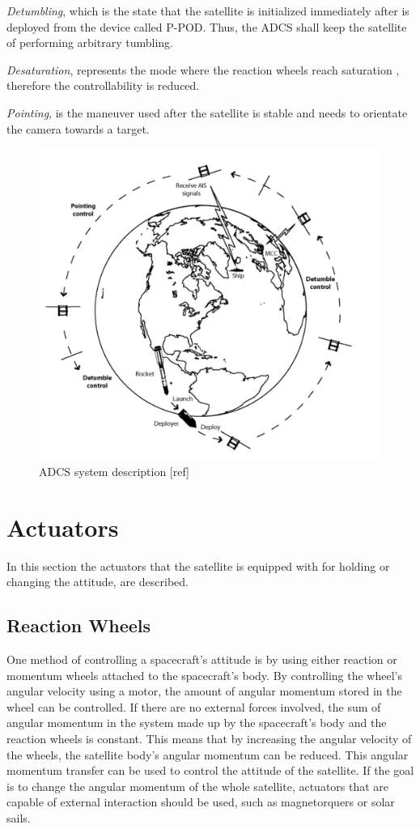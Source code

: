 \textit{Detumbling}, which is the state that the satellite is initialized immediately after is deployed from the device called P-POD. Thus, the ADCS shall keep the satellite of performing arbitrary tumbling.

\textit{Desaturation}, represents the mode where the reaction wheels reach saturation 
, therefore the controllability is reduced.

\textit{Pointing}, is the maneuver used after the satellite is stable and needs to orientate the camera towards a target.

\begin{figure}[H]
	\centering
	\includegraphics[width=0.7\linewidth]{figures/adcs}
	\caption{ADCS system description [ref]}
	\label{fig:cubee}
\end{figure}




\section{Actuators}
 In this section the actuators that the satellite is equipped with for holding or changing the attitude, are described.
\subsection{Reaction Wheels}

One method of controlling a spacecraft's attitude is by using either reaction or momentum wheels attached to the spacecraft's body. By controlling the wheel's angular velocity using a motor, the amount of angular momentum stored in the wheel can be controlled. If there are no external forces involved, the sum of angular momentum in the system made up by the spacecraft's body and the reaction wheels is constant. This means that by increasing the angular velocity of the wheels, the satellite body's angular momentum can be reduced. This angular momentum transfer can be used to control the attitude of the satellite. If the goal is to change the angular momentum of the whole satellite, actuators that are capable of external interaction should be used, such as magnetorquers or solar sails.

